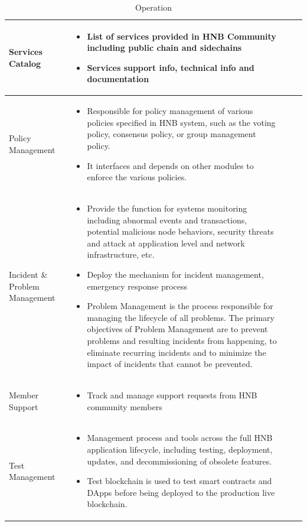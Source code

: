 \documentclass[fleqn,10pt]{SelfArx} %
\begin{document}
\begin{table}[!hbt]
\caption{Operation}
\centering
\begin{tabular}{lp{10cm}p{50cm}r}
\toprule
Services Catalog
 & 
\begin{itemize}
\item{List of services provided in HNB Community including public chain and sidechains}
\item{Services support info, technical info and documentation}
\end{itemize}\\
\midrule
Policy Management
 & 
\begin{itemize}
\item{Responsible for policy management of various policies specified in HNB system, such as the voting policy, consensus policy, or group management policy. }
\item{It interfaces and depends on other modules to enforce the various policies. }
\end{itemize}\\
\midrule
Incident \& Problem Management
 & 
\begin{itemize}
\item{Provide the function for systems monitoring including abnormal events and transactions, potential malicious node behaviors, security threats and attack at application level and network infrastructure, etc.}
\item{Deploy the mechanism for incident management, emergency response process}
\item{Problem Management is the process responsible for managing the lifecycle of all problems. The primary objectives of Problem Management are to prevent problems and resulting incidents from happening, to eliminate recurring incidents and to minimize the impact of incidents that cannot be prevented.}
\end{itemize}
\\
\midrule
Member Support
 & 
\begin{itemize}
\item{Track and manage support requests from HNB community members}
\end{itemize}
\\
\midrule
Test Management
 & 
\begin{itemize}
\item{Management process and tools across the full HNB application lifecycle, including testing, deployment, updates, and decommissioning of obsolete features. }
\item{Test blockchain is used to test smart contracts and DApps before being deployed to the production live blockchain. }

\end{itemize}
\end{tabular}
\end{table}
\end{document}
